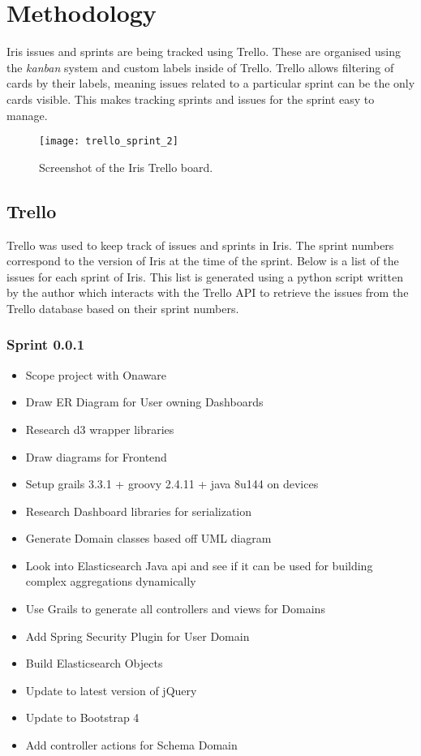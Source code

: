 \documentclass[12pt]{report}
\begin{document}
\chapter{Methodology}
Iris issues and sprints are being tracked using Trello. These are organised using the {\em kanban} system and custom labels inside of Trello. Trello allows filtering of cards by their labels, meaning issues related to a particular sprint can be the only cards visible. This makes tracking sprints and issues for the sprint easy to manage.

\begin{figure}[H]
\begin{tcolorbox}
\begin{center}
\texttt{[image: trello\_sprint\_2]}
\end{center}
\end{tcolorbox}
\caption{Screenshot of the Iris Trello board.}
\end{figure}

\section{Trello}
Trello was used to keep track of issues and sprints in Iris. The sprint numbers correspond to the version of Iris at the time of the sprint. Below is a list of the issues for each sprint of Iris. This list is generated using a python script written by the author which interacts with the Trello API to retrieve the issues from the Trello database based on their sprint numbers.
\subsection*{Sprint 0.0.1}
\begin{itemize}
\item Scope project with Onaware
\item Draw ER Diagram for User owning Dashboards
\item Research d3 wrapper libraries
\item Draw diagrams for Frontend
\item Setup grails 3.3.1 + groovy 2.4.11 + java 8u144 on devices
\item Research Dashboard libraries for serialization
\item Generate Domain classes based off UML diagram
\item Look into Elasticsearch Java api and see if it can be used for building complex aggregations dynamically
\item Use Grails to generate all controllers and views for Domains
\item Add Spring Security Plugin for User Domain
\item Build Elasticsearch Objects
\item Update to latest version of jQuery
\item Update to Bootstrap 4
\item Add controller actions for Schema Domain
\end{itemize}
\end{document}
